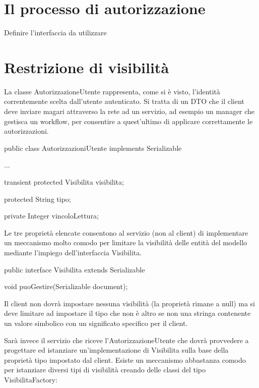 \section{Il processo di autorizzazione}
Definire l'interfaccia da utilizzare

\section{Restrizione di visibilità}
La classe AutorizzazioneUtente rappresenta, come si è visto, l'identità correntemente scelta dall'utente autenticato. Si tratta di un DTO che il client deve inviare magari attraverso la rete ad un servizio, ad esempio un manager che gestisca un workflow, per consentire a quest'ultimo di applicare correttamente le autorizzazioni.

\begin{java}

public class AutorizzazioniUtente implements Serializable {
  
  ...
  
  transient protected Visibilita visibilita;

  protected String tipo;

  private Integer vincoloLettura;

}
\end{java}

Le tre proprietà elencate consentono al servizio (non al client) di implementare un meccanismo molto comodo per limitare la visibilità delle entità del modello mediante l'impiego dell'interfaccia Visibilita.

\begin{java}
public interface Visibilita extends Serializable {

  void puoGestire(Serializable document);

}
\end{java}

Il client non dovrà impostare nessuna visibilità (la proprietà rimane a null)  ma si deve limitare ad impostare il tipo che non è altro se non una stringa contenente un valore simbolico con un significato specifico per il client.

Sarà invece il servizio che riceve l'AutorizzazioneUtente che dovrà provvedere a progettare ed istanziare un'implementazione di Visibilita sulla base della proprietà tipo impostato dal client. Esiste un meccanismo abbastanza comodo per istanziare diversi tipi di visibilità creando delle classi del tipo VisibilitaFactory:

